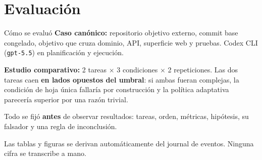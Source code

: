 \documentclass[10pt,aspectratio=169]{beamer}
\begin{document}
\section{Evaluación}

\begin{frame}{Cómo se evaluó}
  \textbf{Caso canónico:} repositorio objetivo externo, commit base congelado,
  objetivo que cruza dominio, API, superficie web y pruebas. Codex CLI
  (\texttt{gpt-5.5}) en planificación y ejecución.

  \bigskip
  \textbf{Estudio comparativo:} 2 tareas $\times$ 3 condiciones $\times$ 2
  repeticiones. Las dos tareas caen \textbf{en lados opuestos del umbral}: si
  ambas fueran complejas, la condición de hoja única fallaría por construcción y
  la política adaptativa parecería superior por una razón trivial.

  \bigskip
  \pause
  Todo se fijó \textbf{antes} de observar resultados: tareas, orden, métricas,
  hipótesis, su falsador y una regla de inconclusión.

  \bigskip
  \small Las tablas y figuras se derivan automáticamente del journal de
  eventos. Ninguna cifra se transcribe a mano.
\end{frame}
\end{document}
